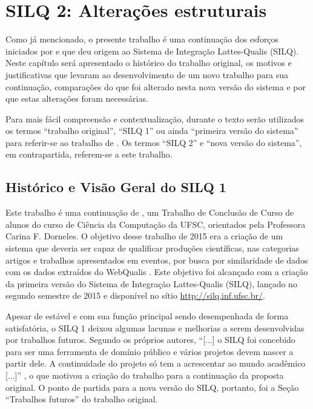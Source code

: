 \documentclass[12pt]{article}
\newcommand{\quotes}[1]{``#1''}
\begin{document}
\section{SILQ 2: Alterações estruturais}\label{cap:dev1}

Como já mencionado, o presente trabalho é uma continuação dos esforços iniciados por \cite{Silq1} e que deu origem ao Sistema de Integração Lattes-Qualis (SILQ). Neste capítulo será apresentado o histórico do trabalho original, os motivos e justificativas que levaram ao desenvolvimento de um novo trabalho para sua continuação, comparações do que foi alterado nesta nova versão do sistema e por que estas alterações foram necessárias.

Para mais fácil compreensão e contextualização, durante o texto serão utilizados os termos \quotes{trabalho original}, \quotes{SILQ 1} ou ainda \quotes{primeira versão do sistema} para referir-se ao trabalho de \cite{Silq1}. Os termos \quotes{SILQ 2} e \quotes{nova versão do sistema}, em contrapartida, referem-se a este trabalho.

\subsection{Histórico e Visão Geral do SILQ 1}

Este trabalho é uma continuação de \cite{Silq1}, um Trabalho de Conclusão de Curso de alunos do curso de Ciência da Computação da UFSC, orientados pela Professora Carina F. Dorneles. O objetivo desse trabalho de 2015 era a criação de um sistema que deveria ser capaz de qualificar produções científicas, nas categorias artigos e trabalhos apresentados em eventos, por busca por similaridade de dados com os dados extraídos do WebQualis \cite[p. 26-27]{Silq1}. Este objetivo foi alcançado com a criação da primeira versão do Sistema de Integração Lattes-Qualis (SILQ), lançado no segundo semestre de 2015 e disponível no sítio \url{http://silq.inf.ufsc.br/}.

Apesar de estável e com sua função principal sendo desempenhada de forma satisfatória, o SILQ 1 deixou algumas lacunas e melhorias a serem desenvolvidas por trabalhos futuros. Segundo os próprios autores, \quotes{[...] o SILQ foi concebido para ser uma ferramenta de domínio público e vários projetos devem nascer a partir dele. A continuidade do projeto só tem a acrescentar ao mundo acadêmico [...]} \cite[p. 79]{Silq1}, o que motivou a criação do trabalho para a continuação da proposta original. O ponto de partida para a nova versão do SILQ, portanto, foi a Seção \quotes{Trabalhos futuros} do trabalho original.
\end{document}
